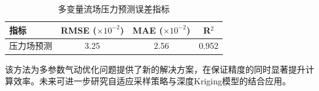 \begin{table}[H]
    \centering
    \caption{多变量流场压力预测误差指标}
    \label{tab:kriging_flow_error}
    \begin{tabular}{lccc}
        \toprule
        \textbf{指标} & \textbf{RMSE} ($\times10^{-2}$) & \textbf{MAE} ($\times10^{-2}$) & \textbf{R$^2$} \\
        \midrule
        压力场预测 & 3.25 & 2.56 & 0.952 \\
        \bottomrule
    \end{tabular}
\end{table}

该方法为多参数气动优化问题提供了新的解决方案，在保证精度的同时显著提升计算效率。未来可进一步研究自适应采样策略与深度Kriging模型的结合应用。